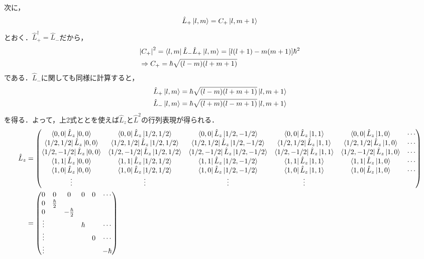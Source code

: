 \documentclass{report}
\begin{document}
次に，
\begin{align}
  \hat{L}_{+}\ket{l,m} = C_{+}\ket{l,m+1}
\end{align}
とおく．$\hat{L}_{+}^{\dagger} = \hat{L}_{-}$だから，
\begin{align}
  &\abs{C_{+}}^2 = \bra{l,m}\hat{L}_{-}\hat{L}_{+}\ket{l,m} = \qty[l(l+1) -m(m+1)]\hbar^2\\
  &\Rightarrow C_{+} = \hbar\sqrt{(l-m)(l+m+1)}
\end{align}
である．$\hat{L}_{-}$に関しても同様に計算すると，
\begin{align}
  \hat{L}_{+}\ket{l,m} = \hbar\sqrt{(l-m)(l+m+1)}\ket{l,m+1}\\
  \hat{L}_{-}\ket{l,m} = \hbar\sqrt{(l+m)(l-m+1)}\ket{l,m+1}
\end{align}
を得る．よって，上2式ととを使えば$\hat{L}_z$と$\hat{L}^2$の行列表現が得られる．
\begin{align}
  \hat{L}_z &=
  \begin{pmatrix} 
    \bra{0,0}\hat{L}_z\ket{0,0} & \bra{0,0}\hat{L}_z\ket{1/2,1/2} & \bra{0,0}\hat{L}_z\ket{1/2,-1/2} & \bra{0,0}\hat{L}_z\ket{1,1} & \bra{0,0}\hat{L}_z\ket{1,0} & \cdots \\
    \bra{1/2,1/2}\hat{L}_z\ket{0,0} & \bra{1/2,1/2}\hat{L}_z\ket{1/2,1/2} & \bra{1/2,1/2}\hat{L}_z\ket{1/2,-1/2} & \bra{1/2,1/2}\hat{L}_z\ket{1,1} & \bra{1/2,1/2}\hat{L}_z\ket{1,0} & \cdots \\
    \bra{1/2,-1/2}\hat{L}_z\ket{0,0} & \bra{1/2,-1/2}\hat{L}_z\ket{1/2,1/2} & \bra{1/2,-1/2}\hat{L}_z\ket{1/2,-1/2} & \bra{1/2,-1/2}\hat{L}_z\ket{1,1} & \bra{1/2,-1/2}\hat{L}_z\ket{1,0} & \cdots \\
    \bra{1,1}\hat{L}_z\ket{0,0} & \bra{1,1}\hat{L}_z\ket{1/2,1/2} & \bra{1,1}\hat{L}_z\ket{1/2,-1/2} & \bra{1,1}\hat{L}_z\ket{1,1} & \bra{1,1}\hat{L}_z\ket{1,0} & \cdots \\
    \bra{1,0}\hat{L}_z\ket{0,0} & \bra{1,0}\hat{L}_z\ket{1/2,1/2} & \bra{1,0}\hat{L}_z\ket{1/2,-1/2} & \bra{1,0}\hat{L}_z\ket{1,1} & \bra{1,0}\hat{L}_z\ket{1,0} & \cdots \\
    \vdots & \vdots & \vdots & \vdots  & &
  \end{pmatrix} \\
  &=
  \begin{pmatrix}
    0 & 0 & 0 & 0 & 0 & \cdots\\
    0 & \frac{\hbar}{2} &  &  &  & \\
    0  & & -\frac{\hbar}{2} &  & & \\
    \vdots & & & \hbar & & \cdots \\
    \vdots & & & & 0 &  \cdots\\
    \vdots & & & & & -\hbar 
  \end{pmatrix}
\end{align}
\end{document}
